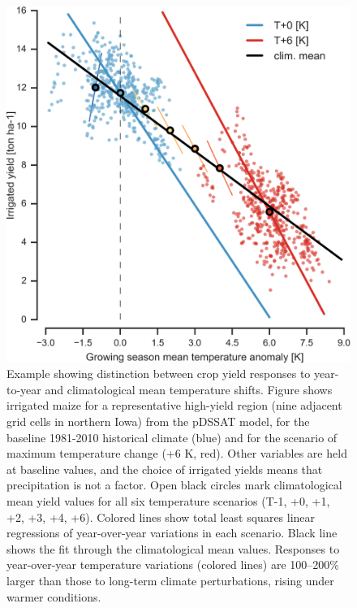 \documentclass[preprint, 5p, times, twocolumn]{elsarticle}
\begin{document}
\begin{figure}[th!]
\centering
   \includegraphics[width=0.95\linewidth]{figures/tempyearvclim.png}
   \caption{Example showing distinction between crop yield responses to year-to-year and climatological mean temperature shifts. Figure shows irrigated maize for a representative high-yield region (nine adjacent grid cells in northern Iowa) from the pDSSAT model, for the baseline 1981-2010 historical climate (blue) and for the scenario of maximum temperature change (+6 K, red). Other variables are held at baseline values, and the choice of irrigated yields means that precipitation is not a factor. Open black circles mark climatological mean yield values for all six temperature scenarios (T-1, +0, +1, +2, +3, +4, +6). Colored lines show total least squares linear regressions of year-over-year variations in each scenario. Black line shows the fit through the climatological mean values.  Responses to year-over-year temperature variations (colored lines) are 100--200\% larger than those to long-term climate perturbations, rising under warmer conditions.}
   \label{fig:yearvclim}
\end{figure}
\end{document}
